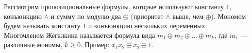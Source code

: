 Рассмотрим пропозициональные формулы, которые используют константу $1$, конъюнкцию $\land$ и сумму по модулю два $\oplus$
(приоритет $\land$ выше, чем $\oplus$). Мономом будем называть константу $1$ и конъюнкцию нескольких переменных. Многочленом
Жегалкина называется формула вида $m_1 \oplus m_2 \oplus \dots \oplus m_k$, где $m_i$~--- различные мономы, $k \ge
0$. Пример: $x_1 x_2 \oplus x_2 \oplus 1$.